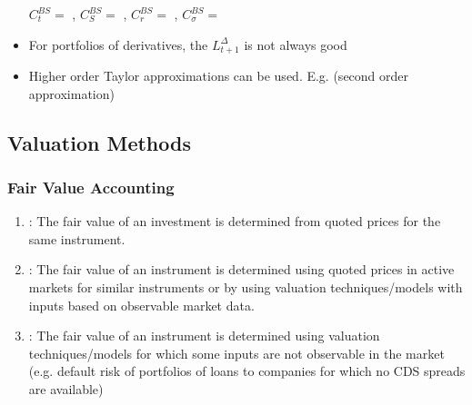 \begin{itemize}[leftmargin=*]
$ C_{t}^{B S}=$ , $C_{S}^{B S}=$ , $C_{r}^{B S}=$ , $C_{\sigma}^{B S}=$ 

    \item For portfolios of derivatives, the  $L_{t+1}^{\Delta}$ is not always good
    \item Higher order Taylor approximations can be used. E.g.  (second order approximation)
\end{itemize}






\subsection*{Valuation Methods}
\subsubsection*{Fair Value Accounting}
\begin{enumerate}[leftmargin=*]
    \item {}: The fair value of an investment is determined from quoted prices for the
same instrument.
    \item {}: The fair value of an instrument is determined using
quoted prices in active markets for similar instruments or by using valuation
techniques/models with inputs based on observable market data.
    \item {}: The fair value of an instrument is determined using
valuation techniques/models for which some inputs are not observable in the market (e.g.
default risk of portfolios of loans to companies for which no CDS spreads are available)
\end{enumerate}
